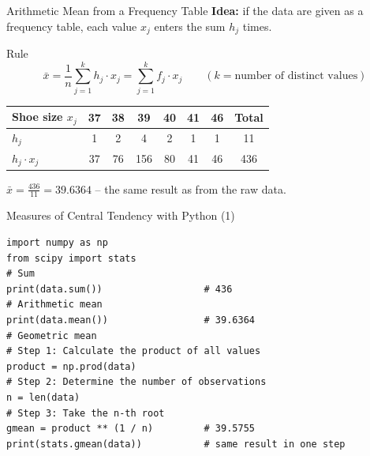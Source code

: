 \documentclass[aspectratio=169,11pt]{beamer}
\begin{document}
\begin{frame}{Arithmetic Mean from a Frequency Table}
  \textbf{Idea:} if the data are given as a frequency table, each value $x_j$ enters the sum $h_j$ times.
  \begin{block}{Rule}
    \[ \bar{x} = \frac{1}{n}\sum_{j=1}^{k} h_j \cdot x_j = \sum_{j=1}^{k} f_j \cdot x_j
       \qquad (k = \text{number of distinct values}) \]
  \end{block}
  \begin{center}
    \renewcommand{\arraystretch}{1.2}
    \begin{tabular}{lccccccc}
      \toprule
      Shoe size $x_j$ & 37 & 38 & 39 & 40 & 41 & 46 & Total \\
      \midrule
      $h_j$ & 1 & 2 & 4 & 2 & 1 & 1 & 11 \\
      $h_j \cdot x_j$ & 37 & 76 & 156 & 80 & 41 & 46 & 436 \\
      \bottomrule
    \end{tabular}
  \end{center}
  $\bar{x} = \frac{436}{11} = \mathbf{39.6364}$ -- the same result as from the raw data.

  \medskip
\end{frame}

\begin{frame}[fragile]{Measures of Central Tendency with Python (1)}
\begin{lstlisting}
import numpy as np
from scipy import stats
# Sum
print(data.sum())                  # 436
# Arithmetic mean
print(data.mean())                 # 39.6364
# Geometric mean
# Step 1: Calculate the product of all values
product = np.prod(data)
# Step 2: Determine the number of observations
n = len(data)
# Step 3: Take the n-th root
gmean = product ** (1 / n)         # 39.5755
print(stats.gmean(data))           # same result in one step
\end{lstlisting}
\end{frame}
\end{document}
